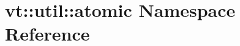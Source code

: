 \hypertarget{namespacevt_1_1util_1_1atomic}{}\section{vt\+:\+:util\+:\+:atomic Namespace Reference}
\label{namespacevt_1_1util_1_1atomic}
